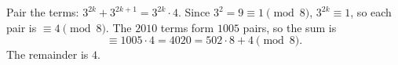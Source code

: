 Pair the terms: $3^{2k}+3^{2k+1}=3^{2k}\cdot4$. Since $3^2=9\equiv1\pmod8$, $3^{2k}\equiv1$, so each pair is $\equiv4\pmod8$. The $2010$ terms form $1005$ pairs, so the sum is
\[
\equiv1005\cdot4=4020=502\cdot8+4\pmod8 .
\]
The remainder is $\boxed{4}$.

